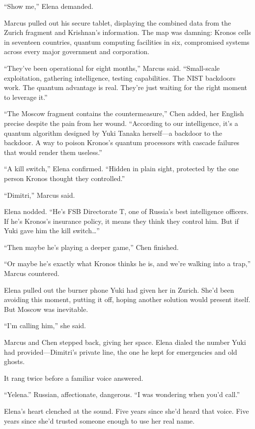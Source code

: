 ``Show me,'' Elena demanded.

Marcus pulled out his secure tablet, displaying the combined data from
the Zurich fragment and Krishnan's information. The map was damning:
Kronos cells in seventeen countries, quantum computing facilities in
six, compromised systems across every major government and corporation.

``They've been operational for eight months,'' Marcus said.
``Small-scale exploitation, gathering intelligence, testing
capabilities. The NIST backdoors work. The quantum advantage is real.
They're just waiting for the right moment to leverage it.''

``The Moscow fragment contains the countermeasure,'' Chen added, her
English precise despite the pain from her wound. ``According to our
intelligence, it's a quantum algorithm designed by Yuki Tanaka
herself---a backdoor to the backdoor. A way to poison Kronos's quantum
processors with cascade failures that would render them useless.''

``A kill switch,'' Elena confirmed. ``Hidden in plain sight, protected
by the one person Kronos thought they controlled.''

``Dimitri,'' Marcus said.

Elena nodded. ``He's FSB Directorate T, one of Russia's best
intelligence officers. If he's Kronos's insurance policy, it means they
think they control him. But if Yuki gave him the kill switch\ldots{}''

``Then maybe he's playing a deeper game,'' Chen finished.

``Or maybe he's exactly what Kronos thinks he is, and we're walking into
a trap,'' Marcus countered.

Elena pulled out the burner phone Yuki had given her in Zurich. She'd
been avoiding this moment, putting it off, hoping another solution would
present itself. But Moscow was inevitable.

``I'm calling him,'' she said.

Marcus and Chen stepped back, giving her space. Elena dialed the number
Yuki had provided---Dimitri's private line, the one he kept for
emergencies and old ghosts.

It rang twice before a familiar voice answered.

``Yelena.'' Russian, affectionate, dangerous. ``I was wondering when
you'd call.''

Elena's heart clenched at the sound. Five years since she'd heard that
voice. Five years since she'd trusted someone enough to use her real
name.

